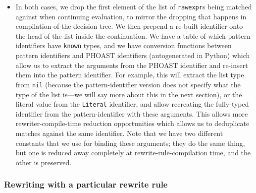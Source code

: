\begin{itemize}
\begin{itemize}
\begin{itemize}
\begin{itemize}
\begin{itemize}
          \begin{itemize}
          \tightlist
          \item
            In both cases, we drop the first element of the list of
            \texttt{rawexpr}s being matched against when continuing
            evaluation, to mirror the dropping that happens in
            compilation of the decision tree. We then prepend a re-built
            identifier onto the head of the list inside the
            continuation. We have a table of which pattern identifiers
            have \texttt{known} types, and we have conversion functions
            between pattern identifiers and PHOAST identifiers
            (autogenerated in Python) which allow us to extract the
            arguments from the PHOAST identifier and re-insert them into
            the pattern identifier. For example, this will extract the
            list type from \texttt{nil} (because the pattern-identifier
            version does not specify what the type of the list is---we
            will say more about this in the next section), or the
            literal value from the \texttt{Literal} identifier, and
            allow recreating the fully-typed identifier from the
            pattern-identifier with these arguments. This allows more
            rewriter-compile-time reduction opportunities which allows
            us to deduplicate matches against the same identifier. Note
            that we have two different constants that we use for binding
            these arguments; they do the same thing, but one is reduced
            away completely at rewrite-rule-compilation time, and the
            other is preserved.
          \end{itemize}
        \end{itemize}
      \end{itemize}
    \end{itemize}
  \end{itemize}
\end{itemize}

\hypertarget{rewriting-with-a-particular-rewrite-rule}{%
\subsubsection{Rewriting with a particular rewrite
rule}\label{rewriting-with-a-particular-rewrite-rule}}

